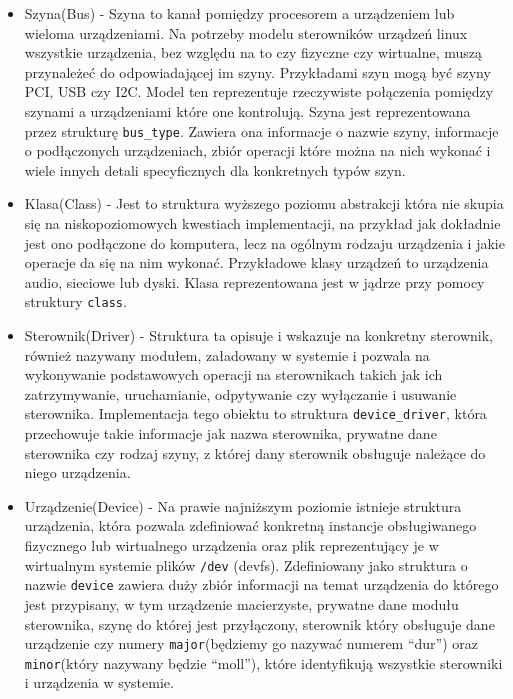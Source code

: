 \documentclass[10pt]{article}
\begin{document}
\begin{itemize}
\item
  Szyna(Bus) - Szyna to kanał pomiędzy procesorem a urządzeniem lub wieloma urządzeniami. Na potrzeby modelu sterowników urządzeń linux wszystkie urządzenia, bez względu na to czy fizyczne czy wirtualne, muszą przynależeć do odpowiadającej im szyny. Przykładami szyn mogą być szyny PCI, USB czy I2C. Model ten reprezentuje rzeczywiste połączenia pomiędzy szynami a urządzeniami które one kontrolują. Szyna jest reprezentowana przez strukturę \texttt{bus\_type}. Zawiera ona informacje o nazwie szyny, informacje o podłączonych urządzeniach, zbiór operacji które można na nich wykonać i wiele innych detali specyficznych dla konkretnych typów szyn.
\item
  Klasa(Class) - Jest to struktura wyższego poziomu abstrakcji która nie skupia się na niskopoziomowych kwestiach implementacji, na przykład jak dokładnie jest ono podłączone do komputera, lecz na ogólnym rodzaju urządzenia i jakie operacje da się na nim wykonać. Przykładowe klasy urządzeń to urządzenia audio, sieciowe lub dyski. Klasa reprezentowana jest w jądrze przy pomocy struktury \texttt{class}.
\item
  Sterownik(Driver) - Struktura ta opisuje i wskazuje na konkretny sterownik, również nazywany modułem, załadowany w systemie i pozwala na wykonywanie podstawowych operacji na sterownikach takich jak ich zatrzymywanie, uruchamianie, odpytywanie czy wyłączanie i usuwanie sterownika. Implementacja tego obiektu to struktura \texttt{device\_driver}, która przechowuje takie informacje jak nazwa sterownika, prywatne dane sterownika czy rodzaj szyny, z której dany sterownik obsługuje należące do niego urządzenia.
\item
  Urządzenie(Device) - Na prawie najniższym poziomie istnieje struktura urządzenia, która pozwala zdefiniować konkretną instancje obsługiwanego fizycznego lub wirtualnego urządzenia oraz plik reprezentujący je w wirtualnym systemie plików \texttt{/dev} (devfs).  Zdefiniowany jako struktura o nazwie \texttt{device} zawiera duży zbiór informacji na temat urządzenia do którego jest przypisany, w tym urządzenie macierzyste, prywatne dane modułu sterownika, szynę do której jest przyłączony, sterownik który obsługuje dane urządzenie czy numery \texttt{major}(będziemy go nazywać numerem ``dur'') oraz \texttt{minor}(który nazywany będzie ``moll''), które identyfikują wszystkie sterowniki i urządzenia w systemie.
\end{itemize}
\end{document}
